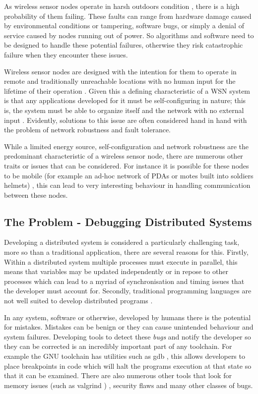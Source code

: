 As wireless sensor nodes operate in harsh outdoors condition \cite{SzewczykPMC04,Werner-Allen:2006:FYV:1298455.1298491}, there is a high probability of them failing. These faults can range from hardware damage caused by environmental conditions or tampering, software bugs, or simply a denial of service caused by nodes running out of power. So algorithms and software need to be designed to handle these potential failures, otherwise they risk catastrophic failure when they encounter these issues.

Wireless sensor nodes are designed with the intention for them to operate in remote and traditionally unreachable locations with no human input for the lifetime of their operation \cite{1437066}. Given this a defining characteristic of a WSN system is that any applications developed for it must be self-configuring in nature; this is, the system must be able to organize itself and the network with no external input \cite{1368897}. Evidently, solutions to this issue are often considered hand in hand with the problem of network robustness and fault tolerance.   

While a limited energy source, self-configuration and network robustness are the predominant characteristic of a wireless sensor node, there are numerous other traits or issues that can be considered. For instance it is possible for these nodes to be mobile (for example an ad-hoc network of PDAs or motes built into soldiers helmets) \cite{4224091}, this can lead to very interesting behaviour in handling communication between these nodes.


\subsection{The Problem - Debugging Distributed Systems}

Developing a distributed system is considered a particularly challenging task, more so than a traditional application, there are several reasons for this. Firstly, Within a distributed system multiple processes must execute in parallel, this means that variables may be updated independently or in repose to other processes which can lead to a myriad of synchronisation and timing issues that the developer must account for. Secondly, traditional programming languages are not well suited to develop distributed programs \cite{93692,345831}.

In any system, software or otherwise, developed by humans there is the potential for mistakes. Mistakes can be benign or they can cause unintended behaviour and system failures. Developing tools to detect these \emph{bugs} and notify the developer so they can be corrected is an incredibly important part of any toolchain. For example the GNU toolchain has utilities such as gdb \cite{stallman1992gdb}, this allows developers to place breakpoints in code which will halt the programs execution at that state so that it can be examined. There are also numerous other tools that look for memory issues (such as valgrind \cite{seward2004valgrind}) \cite{Bond:2007:TBA:1297105.1297057,Nethercote:2007:SBM:1254810.1254820}, security flaws \cite{898880,976940} and many other classes of bugs.

